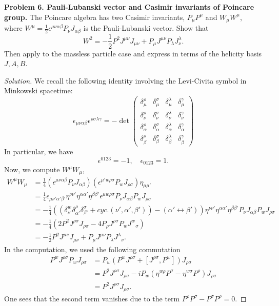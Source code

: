 \textbf{Problem 6. Pauli-Lubanski vector and Casimir invariants of Poincare group.} The Poincare algebra has two Casimir invariants, $P_\mu P^\mu$ and $W_\mu W^\mu$, where $W^\mu = \frac{1}{2} \epsilon^{\mu \nu \alpha \beta} P_\nu J_{\alpha \beta}$ is the Pauli-Lubanski vector. Show that
\[
	W^2 = -\frac{1}{2} P^2 J^{\mu \nu} J_{\mu \nu} + P_\mu J^{\mu \nu} P_\lambda J^\lambda _ \nu.
\]
Then apply to the massless particle case and express in terms of the helicity basis $J, A, B$.

\begin{proof}[Solution]
	We recall the following identity involving the Levi-Civita symbol in Minkowski spacetime:
	\[
		\epsilon_{\mu \nu \alpha \beta} \epsilon^{\rho \sigma \lambda \gamma}=-\operatorname{det}\left(\begin{array}{llll}
		\delta_\mu^\rho & \delta_\mu^\sigma & \delta_\mu^\lambda & \delta_\mu^\gamma \\
		\delta_\nu^\rho & \delta_\nu^\sigma & \delta_\nu^\lambda & \delta_\nu^\gamma \\
		\delta_\alpha^\rho & \delta_\alpha^\sigma & \delta_\alpha^\lambda & \delta_\alpha^\gamma \\
		\delta_\beta^\rho & \delta_\beta^\sigma & \delta_\beta^\lambda & \delta_\beta^\gamma
		\end{array}\right)
	\]
	In particular, we have
	\[
		\epsilon^{0 1 2 3} = -1, \quad \epsilon_{0 1 2 3} = 1.
	\]
	Now, we compute $W^\mu W_\mu$,
	\begin{align*}
		W^\mu W_\mu
		&= \frac{1}{4} (\epsilon^{\mu \nu \alpha \beta} P_\nu J_{\alpha \beta}) (\epsilon^{\mu' w \rho \sigma} P_w J_{\rho \sigma}) \eta_{\mu \mu'} \\
		&= \frac{1}{4} \epsilon_{\mu \nu' \alpha' \beta'} \eta^{\nu \nu'} \eta^{\alpha \alpha'} \eta^{\beta \beta'} \epsilon^{\mu w \rho \sigma} P_\nu J_{\alpha \beta} P_w J_{\rho \sigma} \\
		&= -\frac{1}{4} ((\delta^w_{\nu'} \delta^\rho_{\alpha'} \delta^\sigma_{\beta'} + cyc.(\nu', \alpha', \beta')) - (\alpha' \leftrightarrow \beta')) \eta^{\nu \nu'} \eta^{\alpha \alpha'} \eta^{\beta \beta'} P_\nu J_{\alpha \beta} P_w J_{\rho \sigma}\\
		&= -\frac{1}{4} (2 P^2 J^{\rho \sigma} J_{\rho \sigma} - 4 P_\rho J^{\rho \sigma} P_w {J^w} _ \sigma) \\
		&= -\frac{1}{2} P^2 J^{\mu \nu} J_{\mu \nu} + P_\mu J^{\mu \nu} P_\lambda {J^\lambda} _ \nu.
	\end{align*}
	In the computation, we used the following commutation
	\begin{align*}
		P^w J^{\rho \sigma} P_w J_{\rho \sigma}
		&= P_w (P^w J^{\rho \sigma} + [J^{\rho \sigma}, P^w]) J_{\rho \sigma} \\
		&= P^2 J^{\rho \sigma} J_{\rho \sigma} - i P_w (\eta^{w \rho} P^\sigma - \eta^{w \sigma} P^\rho) J_{\rho \sigma} \\
		&= P^2 J^{\rho \sigma} J_{\rho \sigma}.
	\end{align*}
	One sees that the second term vanishes due to the term $P^\rho P^\sigma - P^\sigma P^\rho = 0$.


\end{proof}

